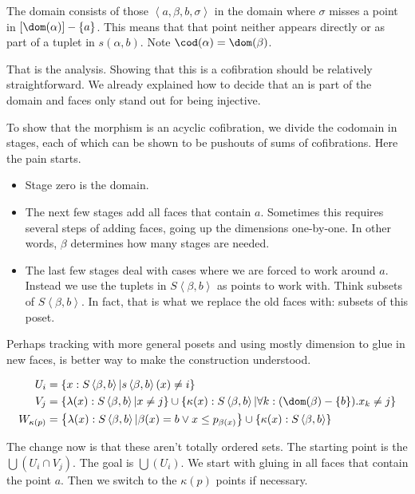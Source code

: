 \documentclass{tac}
\newcommand\set[1]{\left\{#1\right\}}
\newcommand\of{:}
\newcommand\tuplet[1]{\left\langle #1 \right\rangle}
\begin{document}
The domain consists of those $\tuplet{a,\beta,b,\sigma}$ in the domain where $\sigma$ misses a point in $[\dom(\alpha)] -\set a$. This means that that point neither appears directly or as part of a tuplet in $s(\alpha,b)$. Note $\cod(\alpha) = \dom(\beta)$.

That is the analysis. Showing that this is a cofibration should be relatively straightforward. We already explained how to decide that an
is part of the domain and faces only stand out for being injective.

To show that the morphism is an acyclic cofibration, we divide the
codomain in stages, each of which can be shown to be pushouts of sums
of cofibrations. Here the pain starts.
\begin{itemize}
\item Stage zero is the domain. 
\item The next few stages add all faces that contain $a$. Sometimes this requires several steps of adding faces, going up the dimensions one-by-one. In other words, $\beta$ determines how many stages are needed.
\item The last few stages deal with cases where we are forced to work around $a$. Instead we use the tuplets in $S\tuplet{\beta,b}$ as points to work with.
Think subsets of $S\tuplet{\beta,b}$. In fact, that is what we replace the old faces with: subsets of this poset.
\end{itemize}

Perhaps tracking with more general posets and using mostly dimension to glue in new faces, is better way to make the construction understood.

\begin{align*}
U_i &= \set{x\of S\tuplet{\beta,b} | s\tuplet{\beta,b}(x) \neq i } \\
V_j &= \set{\lambda(x)\of S\tuplet{\beta,b} | x \neq j }\cup\set{\kappa(x)\of S\tuplet{\beta,b}| \forall k\of(\dom(\beta)-\set b). x_k\neq j } \\
W_{\kappa(p)} &= \set{\lambda(x)\of S\tuplet{\beta,b} | \beta(x) = b \vee x \leq p_{\beta(x)} }\cup\set{\kappa(x)\of S\tuplet{\beta,b}} \\
\end{align*}

The change now is that these aren't totally ordered sets. The starting point is the $\bigcup(U_i\cap V_j)$. The goal is $\bigcup(U_i)$. We start with gluing in all faces that contain the point $a$. Then we switch to the $\kappa(p)$ points if necessary.
\end{document}
